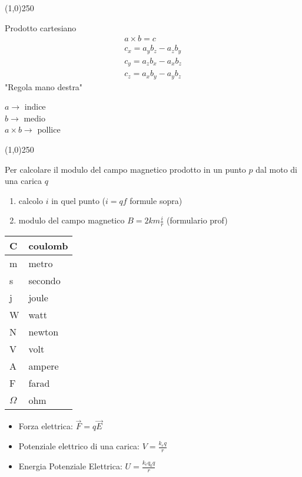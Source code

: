 \documentclass[14pt]{extarticle}
\begin{document}
\begin{center}
    \line(1,0){250}
\end{center}
Prodotto cartesiano
\begin{align*}
    a\times b=c\\
    c_x=a_yb_z-a_zb_y\\
    c_y=a_zb_x-a_xb_z\\
    c_z=a_xb_y-a_yb_z
\end{align*}
"Regola mano destra"
\begin{center}
    $a \rightarrow$ indice\\
    $b \rightarrow$ medio\\
    $a\times b \rightarrow$ pollice
\end{center}
\begin{center}
    \line(1,0){250}
\end{center}

Per calcolare il modulo del campo magnetico prodotto in un punto $p$ dal moto di una carica $q$
\begin{enumerate}
    \item calcolo $i$ in quel punto ($i=qf$ formule sopra)
    \item modulo del campo magnetico $B=2km\frac{i}{r}$ (formulario prof) 
\end{enumerate}

    \begin{tabular}{l|l}
    C & coulomb \\ \hline
    m & metro   \\ \hline
    s & secondo \\ \hline
    j & joule   \\ \hline
    W & watt    \\ \hline
    N & newton  \\ \hline
    V & volt    \\ \hline
    A & ampere  \\ \hline
    F & farad   \\ \hline
    $\Omega$ & ohm    
    \end{tabular}





\begin{itemize}
    \item Forza elettrica: $\overrightarrow{F}=q\overrightarrow{E}$
    \item Potenziale elettrico di una carica: $V=\frac{k_eq}{r}$
    \item Energia Potenziale Elettrica: $U=\frac{k_eq_0q}{r}$
\end{itemize}
\end{document}
